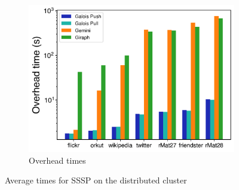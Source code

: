 \documentclass{meetings}
\begin{document}
\begin{figure}
\begin{subfigure}{0.32\textwidth}
		\includegraphics[width=\linewidth]{../../plots/distributedSSSP_overheadTime.png}
		\caption{Overhead times}
		\label{fig:distributedSSSP_overhead}
	\end{subfigure}
	\caption{Average times for SSSP on the distributed cluster}
	\label{fig:distributedSSSP}
\end{figure}
\end{document}
